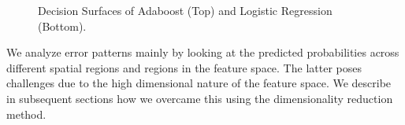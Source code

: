\documentclass[11pt, letterpaper, journal]{IEEEtran}
\begin{document}
\begin{figure}[!h]
    \centering
    \qquad
    \caption{Decision Surfaces of Adaboost (Top) and Logistic Regression (Bottom). }
    \label{fig:decision_surface}
\end{figure}

We analyze error patterns mainly by looking at the predicted probabilities across different spatial regions and regions in the feature space. The latter poses challenges due to the high dimensional nature of the feature space. We describe in subsequent sections how we overcame this using the dimensionality reduction method.
\end{document}

